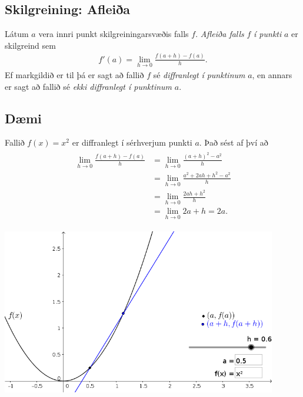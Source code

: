 \documentclass[b5paper,11pt,icelandic]{sphinxmanual}
\begin{document}
\subsection{Skilgreining: Afleiða}
\label{kafli03:skilgreining-afleia}
Látum \(a\) vera innri punkt skilgreiningarsvæðis falls \(f\).
\textit{Afleiða falls} \(f\) \emph{í punkti} \(a\) er skilgreind sem
\begin{equation*}
\begin{split}f'(a)=\lim_{h\rightarrow 0}\frac{f(a+h)-f(a)}{h}.\end{split}
\end{equation*}
Ef markgildið er til þá er sagt að fallið \(f\) sé
\textit{diffranlegt} \emph{í
punktinum} \(a\), en annars er sagt að fallið sé \emph{ekki diffranlegt í
punktinum} \(a\).


\subsection{Dæmi}
\label{kafli03:daemi}
Fallið \(f(x) = x^2\) er diffranlegt í sérhverjum punkti \(a\).
Það sést af því að
\begin{equation*}
\begin{split}\begin{aligned}
\lim_{h\to 0} \frac{f(a+h)-f(a)}{h}
&= \lim_{h\to 0} \frac{(a+h)^2-a^2}{h}\\
&= \lim_{h\to 0} \frac{a^2+2ah+h^2-a^2}{h}\\
&= \lim_{h\to 0} \frac{2ah+h^2}{h}\\
&= \lim_{h\to 0} 2a+h = 2a.\end{aligned}\end{split}
\end{equation*}

\begin{center}
\includegraphics[width=12cm,keepaspectratio=true]{./01_afleida.png}
\end{center}
\end{document}
